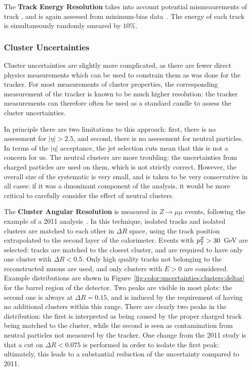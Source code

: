 	The \textbf{Track Energy Resolution} takes into account potential mismeaurements of track \pt, and is again assessed from minimum-bias data~. The energy of each track is simultaneously randomly smeared by $10\%$. 

	\subsubsection{Cluster Uncertainties}

	Cluster uncertainties are slightly more complicated, as there are fewer direct physics measurements which can be used to constrain them as was done for the tracker. For most measurements of cluster properties, the corresponding measurement of the tracker is known to be much higher resolution: the tracker measurements can therefore often be used as a standard candle to assess the cluster uncertainties.

	In principle there are two limitations to this approach: first, there is no assessment for $|\eta| > 2.5$, and second, there is no assessment for neutral particles. In terms of the $|\eta|$ acceptance, the jet selection cuts mean that this is not a concern for us. The neutral clusters are more troubling: the uncertainties from charged particles are used on them, which is not strictly correct. However, the overall size of the systematic is very small, and is taken to be very conservative in all cases: if it was a dmoninant component of the analysis, it would be more critical to carefully consider the effect of neutral clusters.

	The \textbf{Cluster Angular Resolution} is measured in $Z\rightarrow \mu\mu$ events, following the example of a 2011 analysis~. In this technique, isolated tracks and isolated clusters are matched to each other in $\Delta R$ space, using the track position extrapolated to the second layer of the calorimeter. Events with $p_{\text{T}}^{Z} > 30$~GeV are selected: tracks are matched to the closest cluster, and are required to have only one cluster with $\Delta R < 0.5$. Only high quality tracks not belonging to the reconstructed muons are used, and only clusters with $E > 0$ are considered. Example distributions are shown in Figure~\ref{fig:color:uncertainties:clusters:deltar} for the barrel region of the detector. Two peaks are visible in most plots: the second one is always at $\Delta R = 0.15$, and is induced by the requirement of having no additional clusters within this range. There are clearly two peaks in the distribution: the first is interpreted as being caused by the proper charged track being matched to the cluster, while the second is seen as contamination from neutral particles not measured by the tracker. One change from the 2011 study is that a cut on $\Delta R< 0.075$ is performed in order to isolate the first peak: ultimately, this leads to a substantial reduction of the uncertainty compared to 2011.


